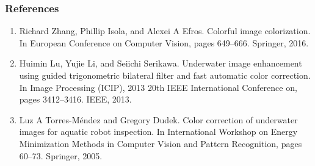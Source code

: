 \documentclass{beamer}
\begin{document}
\begin{frame}
\frametitle{\textbf{References}}
\footnotesize
\begin{enumerate}
\item Richard Zhang, Phillip Isola, and Alexei A Efros. Colorful image colorization. In European Conference on Computer Vision,
pages 649–666. Springer, 2016.
\item Huimin Lu, Yujie Li, and Seiichi Serikawa. Underwater image enhancement using guided trigonometric bilateral filter and fast
automatic color correction. In Image Processing (ICIP), 2013 20th IEEE International Conference on, pages 3412–3416. IEEE, 2013.
\item Luz A Torres-Méndez and Gregory Dudek. Color correction of underwater images for aquatic robot inspection. In International
Workshop on Energy Minimization Methods in Computer Vision and Pattern Recognition, pages 60–73. Springer, 2005.



\end{enumerate}
\end{frame}
\end{document}
